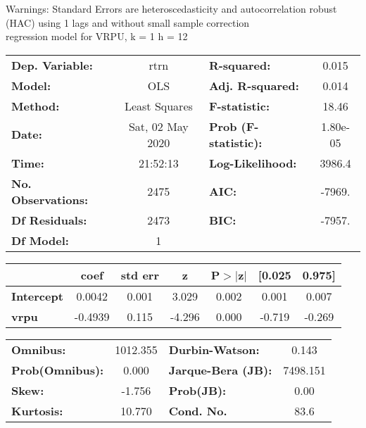 Warnings: \newline
 [1] Standard Errors are heteroscedasticity and autocorrelation robust (HAC) using 1 lags and without small sample correction\\ 

regression model for VRPU, k = 1 h = 12\begin{center}
\begin{tabular}{lclc}
\toprule
\textbf{Dep. Variable:}    &       rtrn       & \textbf{  R-squared:         } &     0.015   \\
\textbf{Model:}            &       OLS        & \textbf{  Adj. R-squared:    } &     0.014   \\
\textbf{Method:}           &  Least Squares   & \textbf{  F-statistic:       } &     18.46   \\
\textbf{Date:}             & Sat, 02 May 2020 & \textbf{  Prob (F-statistic):} &  1.80e-05   \\
\textbf{Time:}             &     21:52:13     & \textbf{  Log-Likelihood:    } &    3986.4   \\
\textbf{No. Observations:} &        2475      & \textbf{  AIC:               } &    -7969.   \\
\textbf{Df Residuals:}     &        2473      & \textbf{  BIC:               } &    -7957.   \\
\textbf{Df Model:}         &           1      & \textbf{                     } &             \\
\bottomrule
\end{tabular}
\begin{tabular}{lcccccc}
                   & \textbf{coef} & \textbf{std err} & \textbf{z} & \textbf{P$> |$z$|$} & \textbf{[0.025} & \textbf{0.975]}  \\
\midrule
\textbf{Intercept} &       0.0042  &        0.001     &     3.029  &         0.002        &        0.001    &        0.007     \\
\textbf{vrpu}      &      -0.4939  &        0.115     &    -4.296  &         0.000        &       -0.719    &       -0.269     \\
\bottomrule
\end{tabular}
\begin{tabular}{lclc}
\textbf{Omnibus:}       & 1012.355 & \textbf{  Durbin-Watson:     } &    0.143  \\
\textbf{Prob(Omnibus):} &   0.000  & \textbf{  Jarque-Bera (JB):  } & 7498.151  \\
\textbf{Skew:}          &  -1.756  & \textbf{  Prob(JB):          } &     0.00  \\
\textbf{Kurtosis:}      &  10.770  & \textbf{  Cond. No.          } &     83.6  \\
\bottomrule
\end{tabular}
\end{center}

